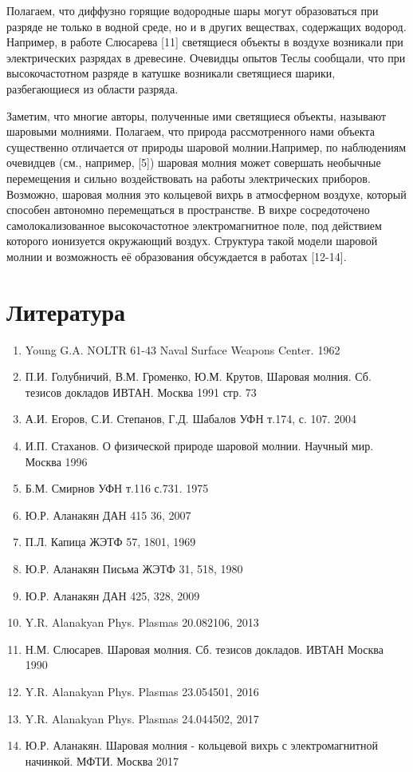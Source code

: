 \documentclass[a4paper]{article}
\begin{document}
Полагаем, что диффузно горящие водородные шары могут образоваться при разряде не только в водной среде, но и в других веществах, содержащих водород. Например, в работе Слюсарева [11] светящиеся объекты в воздухе возникали при электрических разрядах в древесине. Очевидцы опытов Теслы сообщали, что при высокочастотном разряде в катушке возникали светящиеся шарики, разбегающиеся из области разряда.

Заметим, что многие авторы, полученные ими светящиеся объекты, называют шаровыми молниями. Полагаем, что природа рассмотренного нами объекта существенно отличается от природы шаровой молнии.Например, по наблюдениям очевидцев (см., например, [5]) шаровая молния может совершать необычные перемещения и сильно воздействовать на работы электрических приборов. Возможно, шаровая молния это кольцевой вихрь в атмосферном воздухе, который способен автономно перемещаться в пространстве. В вихре сосредоточено самолокализованное высокочастотное электромагнитное поле, под действием которого ионизуется окружающий воздух. Структура такой модели шаровой молнии и возможность её образования обсуждается в работах [12-14]. 

\newpage
\section{Литература}
\begin{enumerate}
    \item Young G.A. NOLTR 61-43 Naval Surface Weapons Center. 1962
    \item П.И. Голубничий, В.М. Громенко, Ю.М. Крутов, Шаровая молния. Сб. тезисов докладов ИВТАН. Москва 1991 стр. 73
    \item А.И. Егоров, С.И. Степанов, Г.Д. Шабалов УФН т.174, с. 107. 2004
    \item И.П. Стаханов. О физической природе шаровой молнии. Научный мир. Москва 1996
    \item Б.М. Смирнов УФН т.116 с.731. 1975
    \item Ю.Р. Аланакян ДАН 415 36, 2007
    \item П.Л. Капица ЖЭТФ 57, 1801, 1969
    \item Ю.Р. Аланакян Письма ЖЭТФ 31, 518, 1980
    \item Ю.Р. Аланакян ДАН 425, 328, 2009
    \item Y.R. Alanakyan Phys. Plasmas 20.082106, 2013
    \item Н.М. Слюсарев. Шаровая молния. Сб. тезисов докладов. ИВТАН Москва 1990
    \item Y.R. Alanakyan Phys. Plasmas 23.054501, 2016
    \item Y.R. Alanakyan Phys. Plasmas 24.044502, 2017
    \item Ю.Р. Аланакян. Шаровая молния - кольцевой вихрь с электромагнитной начинкой. МФТИ. Москва 2017
    
    
\end{enumerate}

 
\end{document}
